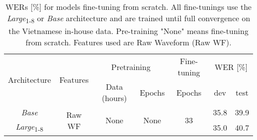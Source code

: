 \begin{table}[!h]
\centering
\begin{adjustbox}{width=\columnwidth,center}
\begin{tabular}{|c|c|c|c|c|c|c|} 
\hline
\multirow{2}{*}{Architecture} & \multirow{2}{*}{Features} & \multicolumn{2}{c|}{Pretraining}              & Fine-tuning         & \multicolumn{2}{c|}{WER [\%]}  \\ 
\cline{3-7}
                              &                           & Data (hours)          & Epochs                & Epochs              & dev  & test                    \\ 
\hline
\textit{Base}                 & \multirow{2}{*}{Raw WF}   & \multirow{2}{*}{None} & \multirow{2}{*}{None} & \multirow{2}{*}{33} & 35.8 & 39.9                    \\ 
\cline{1-1}\cline{6-7}
\textit{Large}\textsubscript{1-8}             &                           &                       &                       &                     & 35.0 & 40.7                    \\
\hline
\end{tabular}
\end{adjustbox}
\caption{\glspl{WER} {[}\%{]} for models fine-tuning from scratch. All fine-tunings use the \textit{Large}\textsubscript{1-8} or \textit{Base} architecture and are trained until full convergence on the Vietnamese in-house data. Pre-training "None" means fine-tuning from scratch. Features used are Raw Waveform (Raw WF).}
\label{table:encoder_compare_RawWF}
\end{table}
